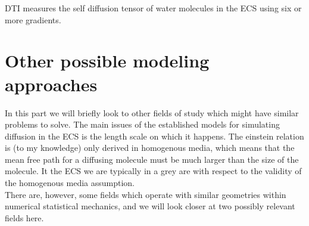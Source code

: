 \documentclass[a4paper,english, 12pt, twoside]{article}
\begin{document}
DTI measures the self diffusion tensor of water molecules in the ECS using six or more gradients. 

\section{Other possible modeling approaches}
In this part we will briefly look to other fields of study which might have similar problems to solve. 
The main issues of the established models for simulating diffusion in the ECS is the length scale on which it happens. 
The einstein relation is (to my knowledge) only derived in homogenous media, which means that the mean free path for a diffusing molecule must be much larger than the size of the molecule. 
It the ECS we are typically in a grey are with respect to the validity of the homogenous media assumption. \\
There are, however, some fields which operate with similar geometries within numerical statistical mechanics, and we will look closer at two possibly relevant fields here.
\end{document}
